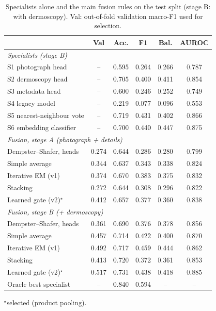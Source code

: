 \documentclass[conference]{IEEEtran}
\begin{document}
\begin{table}[!t]
\caption{Specialists alone and the main fusion rules on the test split (stage B: with dermoscopy). Val: out-of-fold validation macro-F1 used for selection.}
\label{tab:spec}
\centering\footnotesize
\begin{tabular}{lccccc}
\toprule
 & Val & Acc. & F1 & Bal. & AUROC \\
\midrule
\multicolumn{6}{l}{\emph{Specialists (stage B)}}\\
S1 photograph head & -- & 0.595 & 0.264 & 0.266 & 0.787 \\
S2 dermoscopy head & -- & 0.705 & 0.400 & 0.411 & 0.854 \\
S3 metadata head & -- & 0.600 & 0.246 & 0.252 & 0.749 \\
S4 legacy model & -- & 0.219 & 0.077 & 0.096 & 0.553 \\
S5 nearest-neighbour vote & -- & 0.719 & 0.431 & 0.402 & 0.866 \\
S6 embedding classifier & -- & 0.700 & 0.440 & 0.447 & 0.875 \\
\midrule
\multicolumn{6}{l}{\emph{Fusion, stage A (photograph + details)}}\\
Dempster--Shafer, heads & 0.274 & 0.644 & 0.286 & 0.280 & 0.799 \\
Simple average & 0.344 & 0.637 & 0.343 & 0.338 & 0.824 \\
Iterative EM (v1) & 0.374 & 0.670 & 0.383 & 0.375 & 0.832 \\
Stacking & 0.272 & 0.644 & 0.308 & 0.296 & 0.822 \\
Learned gate (v2)$^\star$ & 0.412 & 0.657 & 0.377 & 0.360 & 0.838 \\
\midrule
\multicolumn{6}{l}{\emph{Fusion, stage B (+ dermoscopy)}}\\
Dempster--Shafer, heads & 0.361 & 0.690 & 0.376 & 0.378 & 0.856 \\
Simple average & 0.457 & 0.714 & 0.422 & 0.400 & 0.870 \\
Iterative EM (v1) & 0.492 & 0.717 & 0.459 & 0.444 & 0.862 \\
Stacking & 0.413 & 0.720 & 0.372 & 0.361 & 0.853 \\
Learned gate (v2)$^\star$ & 0.517 & 0.731 & 0.438 & 0.418 & 0.885 \\
Oracle best specialist & -- & 0.840 & 0.594 & -- & -- \\
\bottomrule
\end{tabular}

\smallskip
\raggedright\scriptsize $^\star$selected (product pooling).
\end{table}
\end{document}
